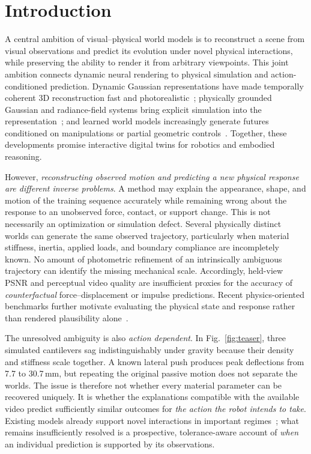 \documentclass[10pt,twocolumn,letterpaper]{article}
\begin{document}
\section{Introduction}
A central ambition of visual--physical world models is to reconstruct a scene from visual observations and predict its evolution under novel physical interactions, while preserving the ability to render it from arbitrary viewpoints. This joint ambition connects dynamic neural rendering to physical simulation and action-conditioned prediction. Dynamic Gaussian representations have made temporally coherent 3D reconstruction fast and photorealistic~\cite{wu2024fourDgs,yang2024deformablegs}; physically grounded Gaussian and radiance-field systems bring explicit simulation into the representation~\cite{xie2024physgaussian,li2023pacnerf,jiang2025phystwin}; and learned world models increasingly generate futures conditioned on manipulations or partial geometric controls~\cite{lee2026p3sim,kim2026dexterous}. Together, these developments promise interactive digital twins for robotics and embodied reasoning.

However, \emph{reconstructing observed motion and predicting a new physical response are different inverse problems}. A method may explain the appearance, shape, and motion of the training sequence accurately while remaining wrong about the response to an unobserved force, contact, or support change. This is not necessarily an optimization or simulation defect. Several physically distinct worlds can generate the same observed trajectory, particularly when material stiffness, inertia, applied loads, and boundary compliance are incompletely known. No amount of photometric refinement of an intrinsically ambiguous trajectory can identify the missing mechanical scale. Accordingly, held-view PSNR and perceptual video quality are insufficient proxies for the accuracy of \emph{counterfactual} force--displacement or impulse predictions. Recent physics-oriented benchmarks further motivate evaluating the physical state and response rather than rendered plausibility alone~\cite{kim2026physgaia,dumebi2026gaussianbench}.

The unresolved ambiguity is also \emph{action dependent}. In Fig.~\ref{fig:teaser}, three simulated cantilevers sag indistinguishably under gravity because their density and stiffness scale together. A known lateral push produces peak deflections from 7.7 to 30.7\,mm, but repeating the original passive motion does not separate the worlds. The issue is therefore not whether every material parameter can be recovered uniquely. It is whether the explanations compatible with the available video predict sufficiently similar outcomes for \emph{the action the robot intends to take}. Existing models already support novel interactions in important regimes~\cite{jiang2025phystwin,wada2026mphygs,wang2026physconvex,ge2026knockgs}; what remains insufficiently resolved is a prospective, tolerance-aware account of \emph{when} an individual prediction is supported by its observations.
\end{document}
